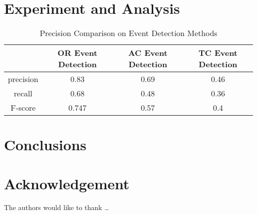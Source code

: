 \blindmathtrue
\blindmathfalse
\blinddescription

\qwuMarker %

\section{Experiment and Analysis} \label{sec-experiment}


\begin{table}  \centering
  \caption{Precision Comparison on Event Detection Methods}
  \label{tbl:overall-experiments}
  \begin{tabular}{cccc}
\toprule
    & OR Event Detection & AC Event Detection & TC Event Detection \\
\midrule
    precision & 0.83 & 0.69 & 0.46 \\
    recall & 0.68 & 0.48 & 0.36 \\
    F-score & 0.747 & 0.57 & 0.4 \\
\bottomrule
\end{tabular}
\end{table}


\section{Conclusions} \label{sec-conclusions}

\blindtext

\section*{Acknowledgement}

\lipsum[1]


The authors would like to thank \ldots

